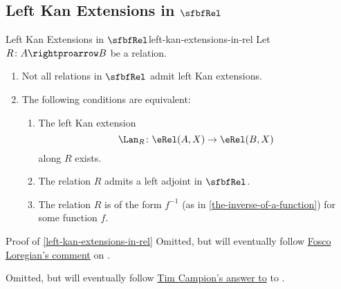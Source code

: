 \subsection{Left Kan Extensions in $\sfbfRel$}\label{subsection-left-kan-extensions-in-rel}
\begin{proposition}{Left Kan Extensions in $\sfbfRel$}{left-kan-extensions-in-rel}%
    Let $R\colon A\rightproarrow B$ be a relation.
    \begin{enumerate}
        \item\label{left-kan-extensions-in-rel-non-existence-of-all-left-kan-extensions-in-rel}Not all relations in $\sfbfRel$ admit left Kan extensions.
        \item\label{left-kan-extensions-in-rel-characterisation-of-relations-admitting-left-kan-extensions-along-them}The following conditions are equivalent:
            \begin{enumerate}
                \item\label{left-kan-extensions-in-rel-characterisation-of-relations-admitting-left-kan-extensions-along-them-1}The left Kan extension
                    \[
                        \Lan_{R}%
                        \colon%
                        \eRel(A,X)%
                        \to%
                        \eRel(B,X)%
                    \]%
                    along $R$ exists.
                \item\label{left-kan-extensions-in-rel-characterisation-of-relations-admitting-left-kan-extensions-along-them-2}The relation $R$ admits a left adjoint in $\sfbfRel$.
                \item\label{left-kan-extensions-in-rel-characterisation-of-relations-admitting-left-kan-extensions-along-them-3}The relation $R$ is of the form $f^{-1}$ (as in \cref{the-inverse-of-a-function}) for some function $f$.
            \end{enumerate}
    \end{enumerate}
\end{proposition}
\begin{Proof}{Proof of \cref{left-kan-extensions-in-rel}}%
    Omitted, but will eventually follow \href{https://mathoverflow.net/questions/460656/existence-and-characterisations-of-left-kan-extensions-and-liftings-in-the-bicat\#comment1194691\_460656}{Fosco Loregian's comment} on \cite{MO460656}.

    Omitted, but will eventually follow \href{https://mathoverflow.net/a/460693}{Tim Campion's answer to} to \cite{MO460656}.
\end{Proof}
